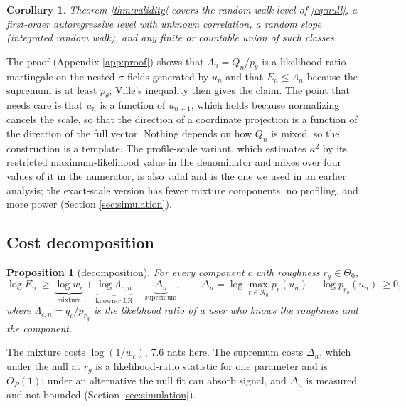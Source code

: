 \documentclass[11pt]{article}
\theoremstyle{plain}
\newtheorem{proposition}{Proposition}
\newtheorem{corollary}{Corollary}
\theoremstyle{definition}
\begin{document}
\begin{corollary}
Theorem \ref{thm:validity} covers the random-walk level of \eqref{eq:null}, a first-order autoregressive level with unknown correlation, a random slope (integrated random walk), and any finite or countable union of such classes.
\end{corollary}

The proof (Appendix \ref{app:proof}) shows that $\Lambda_n = Q_n/p_\theta$ is a likelihood-ratio martingale on the nested $\sigma$-fields generated by $u_n$ and that $E_n\le\Lambda_n$ because the supremum is at least $p_\theta$; Ville's inequality then gives the claim. The point that needs care is that $u_n$ is a function of $u_{n+1}$, which holds because normalizing cancels the scale, so that the direction of a coordinate projection is a function of the direction of the full vector. Nothing depends on how $Q_n$ is mixed, so the construction is a template. The profile-scale variant, which estimates $\kappa^2$ by its restricted maximum-likelihood value in the denominator and mixes over four values of it in the numerator, is also valid and is the one we used in an earlier analysis; the exact-scale version has fewer mixture components, no profiling, and more power (Section \ref{sec:simulation}).

\subsection{Cost decomposition}

\begin{proposition}[decomposition]
\label{prop:cost}
For every component $c$ with roughness $r_g\in\Theta_0$,
\begin{equation}
\log E_n \ \ge\ \underbrace{\log w_c}_{\text{mixture}} + \underbrace{\log \Lambda_{c,n}}_{\text{known-}r\text{ LR}} - \underbrace{\Delta_n}_{\text{supremum}}, \qquad \Delta_n = \log \max_{r \in \mathcal{R}_0} p_r(u_n) - \log p_{r_g}(u_n) \ \ge 0,
\label{eq:oracle}
\end{equation}
where $\Lambda_{c,n} = q_c/p_{r_g}$ is the likelihood ratio of a user who knows the roughness and the component.
\end{proposition}

The mixture costs $\log(1/w_c)$, 7.6 nats here. The supremum costs $\Delta_n$, which under the null at $r_g$ is a likelihood-ratio statistic for one parameter and is $O_P(1)$; under an alternative the null fit can absorb signal, and $\Delta_n$ is measured and not bounded (Section \ref{sec:simulation}).
\end{document}
